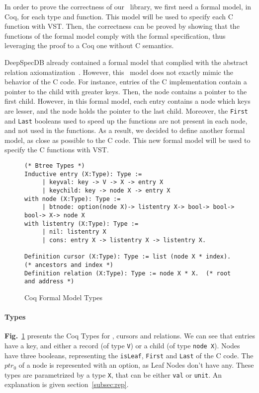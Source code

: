 In order to prove the correctness of our \btrees\ library, we first need a formal model, in Coq, for each type and function.
This model will be used to specify each C function with VST.
Then, the correctness can be proved by showing that the functions of the formal model comply with the formal specification, thus leveraging the proof to a Coq one without C semantics.

DeepSpecDB already contained a formal model that complied with the abstract relation axiomatization~\cite{brian}.
However, this \btree\ model does not exactly mimic the behavior of the C code.
For instance, entries of the C implementation contain a pointer to the child with greater keys.
Then, the node contains a pointer to the first child.
However, in this formal model, each entry contains a node which keys are lesser, and the node holds the pointer to the last child.
Moreover, the \texttt{First} and \texttt{Last} booleans used to speed up the functions are not present in each node, and not used in the functions.
As a result, we decided to define another formal model, as close as possible to the C code.
This new formal model will be used to specify the C functions with VST.


\begin{figure}
\begin{lstlisting}[language=Coq]
(* Btree Types *)
Inductive entry (X:Type): Type :=
     | keyval: key -> V -> X -> entry X
     | keychild: key -> node X -> entry X
with node (X:Type): Type :=
     | btnode: option(node X)-> listentry X-> bool-> bool-> bool-> X-> node X
with listentry (X:Type): Type :=
     | nil: listentry X
     | cons: entry X -> listentry X -> listentry X.

Definition cursor (X:Type): Type := list (node X * index). (* ancestors and index *)
Definition relation (X:Type): Type := node X * X.  (* root and address *)
\end{lstlisting}
\label{coqtypes}
\caption{Coq Formal Model Types}
\end{figure}

\paragraph{Types}\textbf{Fig.}~\ref{coqtypes} presents the Coq Types for \btrees, cursors and relations.
We can see that entries have a key, and either a record (of type \texttt{V}) or a child (of type \texttt{node X}).
Nodes have three booleans, representing the \texttt{isLeaf}, \texttt{First} and \texttt{Last} of the C code.
The $ptr_0$ of a node is represented with an option, as Leaf Nodes don't have any.
These types are parametrized by a type \texttt{X}, that can be either \texttt{val} or \texttt{unit}.
An explanation is given section~\ref{subsec:rep}.

